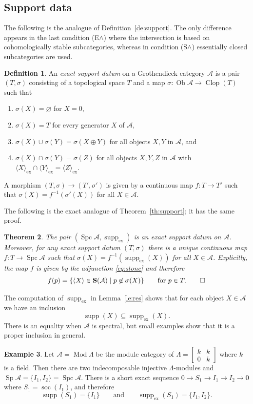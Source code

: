 \documentclass[a4paper]{amsart}
\theoremstyle{plain}
\newtheorem{thm}{Theorem}[section]
\theoremstyle{definition}
\newtheorem{defn}[thm]{Definition}
\newtheorem{exm}[thm]{Example}
\theoremstyle{remark}
\numberwithin{equation}{section}
\newcommand{\Clop}{\operatorname{Clop}}
\newcommand{\Mod}{\operatorname{Mod}}
\newcommand{\Ob}{\operatorname{Ob}}
\newcommand{\soc}{\operatorname{soc}}
\newcommand{\Sp}{\operatorname{Sp}}
\newcommand{\Spc}{\operatorname{Spc}}
\newcommand{\supp}{\operatorname{supp}}
\newcommand{\suppex}{\operatorname{supp}_{\mathrm{ex}}}
\newcommand{\ex}{\mathrm{ex}}
\newcommand{\smatrix}[1]{\left[\begin{smallmatrix}#1\end{smallmatrix}\right]}
\def\A{\mathcal A}
\def\bfS{\mathbf S}
\def\s{\sigma}
\def\La{\Lambda}
\begin{document}
\subsection*{Support data}

The following is the analogue of Definition~\ref{de:support}. The only
difference appears in the last condition (E$\wedge$) where the
intersection is based on cohomologically stable subcategories, whereas
in condition (S$\wedge$) essentially closed subcategories are used. 

\begin{defn}
An \emph{exact support datum} on a Grothendieck category $\A$ is a pair
$(T,\s)$ consisting of a topological space $T$ and a map
$\s\colon\Ob\A\to \Clop(T)$ such that
\begin{enumerate}
\item[(E$0$)] $\s(X)=\varnothing$ for $X=0$,
\item[(E$1$)] $\s(X)=T$ for every generator $X$ of $\A$,
\item[(E$\vee$)] $\s(X)\cup\s(Y)=\s(X\oplus Y)$ for all objects $X,Y$ in
  $\A$, and
\item[(E$\wedge$)] $\s(X)\cap\s(Y)=\s(Z)$ for all objects $X,Y,Z$ in $\A$
  with $\langle X\rangle_\ex\cap \langle Y\rangle_\ex=\langle Z\rangle_\ex$.
\end{enumerate}
A morphism $(T,\s)\to (T',\s')$ is given by a continuous map $f\colon
T\to T'$ such that $\s(X)=f^{-1}(\s'(X))$ for all $X\in\A$.
\end{defn}

The following is the exact analogue of Theorem~\ref{th:support}; it has the same proof.

\begin{thm}
  \pushQED{\qed}
  The pair $(\Spc\A,\suppex)$ is an exact support datum on $\A$. Moreover,
  for any exact support datum $(T,\s)$ there is a unique continuous map
  $f\colon T\to\Spc\A$ such that $\s(X)=f^{-1}(\suppex(X))$ for all
  $X\in\A$. Explicitly, the map $f$ is given by the adjunction
  \eqref{eq:stone} and therefore
  \[f(p)=\{\langle X\rangle\in\bfS(\A)\mid p\not\in\s(X)\}\qquad\text{for
    }p\in T.\qedhere\] 
\end{thm}

The computation of $\suppex$ in  Lemma~\ref{le:res} shows that for each object $X\in\A$ we
have an inclusion
\[\supp(X)\subseteq\suppex(X).\]
There is an equality when $\A$ is spectral, but small examples show
that it is a proper inclusion in general.

\begin{exm}
Let $\A=\Mod\La$ be the module category of $\La=\smatrix{k&k\\0&k}$
where $k$ is a field. Then there are two indecomposable injective
$\La$-modules and $\Sp\A=\{I_1,I_2\}=\Spc\A$. There is a short exact
sequence $0\to S_1\to I_1\to I_2\to 0$ where $S_1=\soc(I_1)$, and therefore
\[\supp(S_1)=\{I_1\}\qquad\text{and}\qquad \suppex(S_1)=\{I_1,I_2\}.\]
\end{exm}
\end{document}
